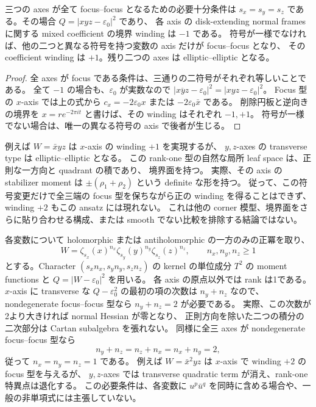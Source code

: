 \begin{corollary}\label{cm:phase}
三つの axes が全て focus--focus となるための必要十分条件は
$s_x=s_y=s_z$ である。その場合 $Q=|xyz-\varepsilon_0|^2$ であり、
各 axis の disk-extending normal frames に関する mixed coefficient の境界 winding は $-1$ である。
符号が一様でなければ、他の二つと異なる符号を持つ変数の axis だけが focus--focus となり、
その coefficient winding は $+1$。残り二つの axes は elliptic--elliptic となる。
\end{corollary}

\begin{proof}
全 axes が focus である条件は、三通りの二符号がそれぞれ等しいことである。
全て $-1$ の場合も、$\varepsilon_0$ が実数なので
$|\overline{xyz}-\varepsilon_0|^2=|xyz-\varepsilon_0|^2$。
Focus 型の $x$-axis では上の式から
$c_x=-2\varepsilon_0 x$ または $-2\varepsilon_0\bar x$ である。
削除円板と逆向きの境界を $x=re^{-2\pi it}$ と書けば、その winding はそれぞれ $-1,+1$。
符号が一様でない場合は、唯一の異なる符号の axis で後者が生じる。
\end{proof}

例えば $W=\bar x yz$ は $x$-axis の winding $+1$ を実現するが、
$y,z$-axes の transverse type は elliptic--elliptic となる。
この rank-one 型の自然な局所 leaf space は、正則な一方向と quadrant の積であり、
境界面を持つ\cite[Theorem 2.1]{miranda-local}。
実際、その axis の stabilizer moment は $\pm(\rho_1+\rho_2)$ という definite な形を持つ。
従って、この符号変更だけで全三端の focus 型を保ちながら正の winding を得ることはできず、
winding $+2$ もこの ansatz には現れない。
これは他の corner 模型、境界面をさらに貼り合わせる構成、または smooth でない比較を排除する結論ではない。

\begin{remark}[正冪を許した場合の必要条件]\label{cm:powers}
各変数について holomorphic または antiholomorphic の一方のみの正冪を取り、
\[
 W=\zeta_{s_x}(x)^{n_x}\zeta_{s_y}(y)^{n_y}\zeta_{s_z}(z)^{n_z},
 \qquad n_x,n_y,n_z\ge1
\]
とする。Character $(s_xn_x,s_yn_y,s_zn_z)$ の kernel の単位成分 $T^2$ の
moment functions と $Q=|W-\varepsilon_0|^2$ を用いる。
各 axis の原点以外では rank は1である。
$x$-axis に transverse な $Q-\varepsilon_0^2$ の最初の項の次数は $n_y+n_z$ なので、
nondegenerate focus--focus 型なら $n_y+n_z=2$ が必要である。
実際、この次数が2より大きければ normal Hessian が零となり、
正則方向を除いた二つの積分の二次部分は Cartan subalgebra を張れない。
同様に全三 axes が nondegenerate focus--focus 型なら
\[
 n_y+n_z=n_z+n_x=n_x+n_y=2,
\]
従って $n_x=n_y=n_z=1$ である。
例えば $W=\bar x^2yz$ は $x$-axis で winding $+2$ の focus 型を与えるが、
$y,z$-axes では transverse quadratic term が消え、rank-one 特異点は退化する。
この必要条件は、各変数に $u^p\bar u^q$ を同時に含める場合や、一般の非単項式には主張していない。
\end{remark}
